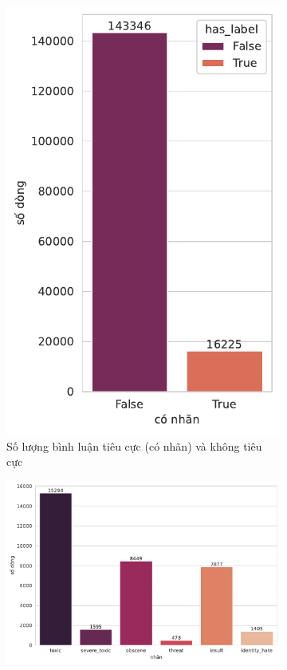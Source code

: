 \begin{figure}[htb!]
    \centering
    \begin{subfigure}[t]{0.3\textwidth}
        \centering
        \includegraphics[width=\textwidth]{chapter_2/image/num_records_has_label.pdf}
        \caption{Số lượng bình luận tiêu cực (có nhãn) và không tiêu cực}
    \end{subfigure}%
    \begin{subfigure}[t]{0.7\textwidth}
        \centering
        \includegraphics[width=\textwidth]{chapter_2/image/num_records_per_label.pdf}

\end{subfigure}
\end{figure}
